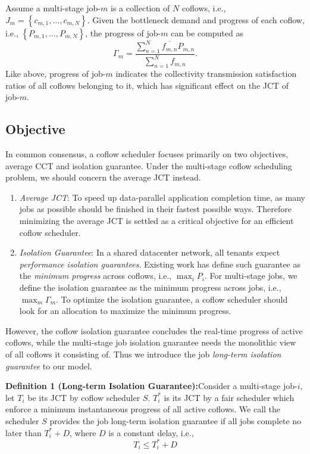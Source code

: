 \documentclass[10pt, conference, letterpaper]{IEEEtran}
\begin{document}
Assume a multi-stage job-$m$ is a collection of $N$ coflows, i.e., $J_m=\left\{c_{m,1},\dots,c_{m,N}\right\}$. Given the bottleneck demand and progress of each coflow, i.e., $\left\{P_{m,1},\dots,P_{m,N}\right\}$, the progress of job-$m$ can be computed as
\begin{equation}
	\Gamma_m = \frac{\sum_{n=1}^N \overline{f_{m,n}}P_{m,n}}{\sum_{n=1}^N f_{m,n}}.
\end{equation}
Like above, progress of job-$m$ indicates the collectivity transmission satisfaction ratios of all coflows belonging to it, which has significant effect on the JCT of job-$m$.

\subsection{Objective}
In common consensus\cite{coflow}, a coflow scheduler focuses primarily on two objectives, average CCT and isolation guarantee. Under the multi-stage coflow  scheduling problem, we should concern the average JCT instead.

\begin{enumerate}
	\item \emph{Average JCT}: To speed up data-parallel application completion time, as many jobs as possible should be finished in their fastest possible ways. Therefore minimizing the average JCT is settled as a critical objective for an efficient coflow scheduler.
	\item \emph{Isolation Guarantee}: In a shared datacenter network, all tenants expect \emph{performance isolation guarantees}. Existing work has define such guarantee as the \emph{minimum progress} across coflows\cite{HUG}, i.e., $\max_i P_i$. For multi-stage jobs, we define the isolation guarantee as the minimum progress across jobs, i.e., $\max_m \Gamma_m$. To optimize the isolation guarantee, a coflow scheduler should look for an allocation to maximize the minimum progress.
\end{enumerate}

However, the coflow isolation guarantee concludes the real-time progress of active coflows, while the multi-stage job isolation guarantee needs the monolithic view of all coflows it consisting of. Thus we introduce the job \emph{long-term isolation guarantee} to our model.

\textbf{Definition 1 (Long-term Isolation Guarantee):}Consider a multi-stage job-$i$, let $T_i$ be its JCT by coflow scheduler $S$. $T_i^*$ is its JCT by a fair scheduler which enforce a minimum instantaneous progress of all active coflows. We call the scheduler $S$ provides the job long-term isolation guarantee if all jobs complete no later than $T_i^* + D$, where $D$ is a constant delay, i.e.,
\begin{equation}
	T_i \leq T_i^* + D
\end{equation}
\end{document}
